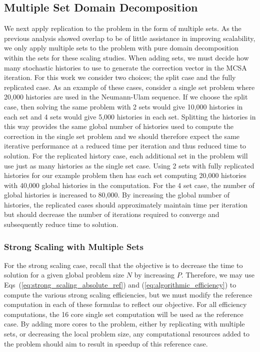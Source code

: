 \documentclass{snamc2013}
\begin{document}
\subsection{Multiple Set Domain Decomposition}
\label{subsec:ms_decomposition}
We next apply replication to the problem in the form of multiple
sets. As the previous analysis showed overlap to be of little
assistance in improving scalability, we only apply multiple sets to
the problem with pure domain decomposition within the sets for these
scaling studies. When adding sets, we must decide how many stochastic
histories to use to generate the correction vector in the MCSA
iteration. For this work we consider two choices; the split case and
the fully replicated case. As an example of these cases, consider a
single set problem where 20,000 histories are used in the Neumann-Ulam
sequence. If we choose the split case, then solving the same problem
with 2 sets would give 10,000 histories in each set and 4 sets would
give 5,000 histories in each set. Splitting the histories in this way
provides the same global number of histories used to compute the
correction in the single set problem and we should therefore expect
the same iterative performance at a reduced time per iteration and
thus reduced time to solution. For the replicated history case, each
additional set in the problem will use just as many histories as the
single set case. Using 2 sets with fully replicated histories for our
example problem then has each set computing 20,000 histories with
40,000 global histories in the computation. For the 4 set case, the
number of global histories is increased to 80,000. By increasing the
global number of histories, the replicated cases should approximately
maintain time per iteration but should decrease the number of
iterations required to converge and subsequently reduce time to
solution.

\subsubsection{Strong Scaling with Multiple Sets}
\label{subsubsec:ms_strong}
For the strong scaling case, recall that the objective is to decrease
the time to solution for a given global problem size $N$ by increasing
$P$. Therefore, we may use Eqs~(\ref{eq:strong_scaling_absolute_ref})
and (\ref{eq:algorithmic_efficiency}) to compute the various strong
scaling efficiencies, but we must modify the reference computation in
each of these formulas to reflect our objective. For all efficiency
computations, the 16 core single set computation will be used as the
reference case. By adding more cores to the problem, either by
replicating with multiple sets, or decreasing the local problem size,
any computational resources added to the problem should aim to result
in speedup of this reference case.
\end{document}
